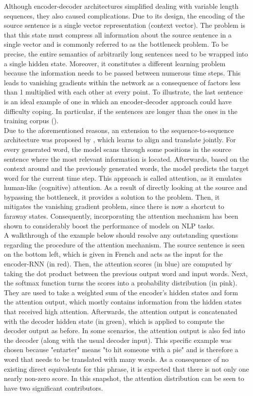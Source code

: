 \documentclass[
]{krantz}
\begin{document}
Although encoder-decoder architectures simplified dealing with variable
length sequences, they also caused complications. Due to its design, the
encoding of the source sentence is a single vector representation
(context vector). The problem is that this state must compress all
information about the source sentence in a single vector and is commonly
referred to as the bottleneck problem. To be precise, the entire
semantics of arbitrarily long sentences need to be wrapped into a single
hidden state. Moreover, it constitutes a different learning problem
because the information needs to be passed between numerous time steps.
This leads to vanishing gradients within the network as a consequence of
factors less than 1 multiplied with each other at every point. To
illustrate, the last sentence is an ideal example of one in which an
encoder-decoder approach could have difficulty coping. In particular, if
the sentences are longer than the ones in the training corpus
(\citep{Manning2022}).\\
Due to the aforementioned reasons, an extension to the
sequence-to-sequence architecture was proposed by \citep{Bahdanau2014}, which
learns to align and translate jointly. For every generated word, the
model scans through some positions in the source sentence where the most
relevant information is located. Afterwards, based on the context around
and the previously generated words, the model predicts the target word
for the current time step. This approach is called attention, as it
emulates human-like (cognitive) attention. As a result of directly
looking at the source and bypassing the bottleneck, it provides a
solution to the problem. Then, it mitigates the vanishing gradient
problem, since there is now a shortcut to faraway states. Consequently,
incorporating the attention mechanism has been shown to considerably
boost the performance of models on NLP tasks.\\
A walkthrough of the example below should resolve any outstanding
questions regarding the procedure of the attention mechanism. The source
sentence is seen on the bottom left, which is given in French and acts
as the input for the encoder-RNN (in red). Then, the attention scores
(in blue) are computed by taking the dot product between the previous
output word and input words. Next, the softmax function turns the scores
into a probability distribution (in pink). They are used to take a
weighted sum of the encoder's hidden states and form the attention
output, which mostly contains information from the hidden states that
received high attention. Afterwards, the attention output is
concatenated with the decoder hidden state (in green), which is applied
to compute the decoder output as before. In some scenarios, the
attention output is also fed into the decoder (along with the usual
decoder input). This specific example was chosen because "entarter"
means "to hit someone with a pie" and is therefore a word that needs
to be translated with many words. As a consequence of no existing direct
equivalents for this phrase, it is expected that there is not only one
nearly non-zero score. In this snapshot, the attention distribution can
be seen to have two significant contributors.
\end{document}
